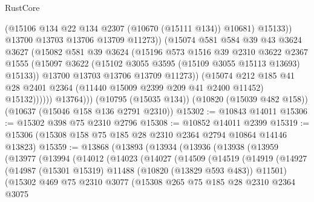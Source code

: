 \begin{lexlean}{RustCore}
\begin{coremodule}
                          (@15106 @134 @22 @134 @2307 (@10670 (@15111 @134)) @10681)
                          @15133))
                      @13700
                      @13703
                      @13706
                      @13709
                      @11273))
                  (@15074
                    @581
                    @584
                    @39
                    @43
                    @3624
                    @3627
                    (@15082
                      @581
                      @39
                      @3624
                      (@15196
                        @573
                        @1516
                        @39
                        @2310
                        @3622
                        @2367
                        @1555
                        (@15097 @3622 (@15102 @3055 @3595 (@15109 @3055 @15113 @13693) @15133))
                        @13700
                        @13703
                        @13706
                        @13709
                        @11273))
                    (@15074
                      @212
                      @185
                      @41
                      @28
                      @2401
                      @2364
                      (@11440 @15009 @2399 @209 @41 @2400 @11452)
                      @15132))))))
          @13764)))
    (@10795 (@15035 @134))
    (@10820 (@15039 @482 @158))
    (@10637 (@15046 @158 @136 @2791 @2310))
@15302 := @10843 @14011
@15306 := @15302 @398 @75 @2310 @2796
@15308 := @10852 @14011 @2399
@15319 := @15306 (@15308 @158 @75 @185 @28 @2310 @2364 @2794 @10864 @14146 @13823)
@15359 := @13868
    (@13893
      (@13934
        (@13936
          (@13938
            (@13959
              (@13977
                (@13994
                  (@14012
                    (@14023
                      (@14027
                        (@14509
                          (@14519
                            (@14919
                              (@14927
                                (@14987 (@15301 @15319) @11488 (@10820 (@13829 @593 @483)) @11501)
                                (@15302
                                  @469
                                  @75
                                  @2310
                                  @3077
                                  (@15308
                                    @265
                                    @75
                                    @185
                                    @28
                                    @2310
                                    @2364
                                    @3075

\end{coremodule}
\end{lexlean}
